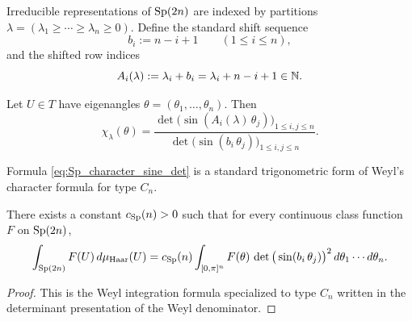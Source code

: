 Irreducible representations of $\mathrm{Sp}(2n)$ are indexed by partitions
$\lambda=(\lambda_1\ge\cdots\ge\lambda_n\ge 0)$.
Define the standard shift sequence
\begin{equation}
\label{eq:Sp_bi_def}
 b_i:=n-i+1\qquad(1\le i\le n),
\end{equation}
and the shifted row indices
\begin{equation}
\label{eq:Sp_Ai_def}
A_i(\lambda):=\lambda_i+b_i=\lambda_i+n-i+1\in\mathbb N.
\end{equation}

\begin{lemma}
\label{lem:Sp_weyl_character}
Let $U\in T$ have eigenangles $\theta=(\theta_1,\dots,\theta_n)$.
Then
\begin{equation}
\label{eq:Sp_character_sine_det}
\chi_{\lambda}(\theta)
=\frac{\det\big(\sin(A_i(\lambda)\,\theta_j)\big)_{1\le i,j\le n}}{\det\big(\sin(b_i\,\theta_j)\big)_{1\le i,j\le n}}.
\end{equation}
\end{lemma}

\begin{remark}
Formula \eqref{eq:Sp_character_sine_det} is a standard trigonometric form of Weyl's character formula for type $C_n$.
\end{remark}

\begin{lemma}
\label{lem:Sp_weyl_integration}
There exists a constant $c_{\mathrm{Sp}}(n)>0$ such that for every continuous class function $F$ on $\mathrm{Sp}(2n)$,
\begin{equation}
\label{eq:Sp_weyl_integration}
\int_{\mathrm{Sp}(2n)}F(U)\,d\mu_{\mathrm{Haar}}(U)
= c_{\mathrm{Sp}}(n)\int_{[0,\pi]^n}F(\theta)\,\det\big(\sin(b_i\,\theta_j)\big)^2\,d\theta_1\cdots d\theta_n.
\end{equation}
\end{lemma}

\begin{proof}
This is the Weyl integration formula specialized to type $C_n$ written in the determinant presentation of the Weyl denominator.
\end{proof}

